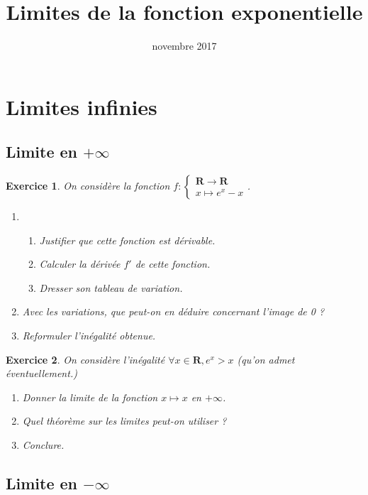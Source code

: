 \documentclass[12pt,a4paper,french]{article}
\title{Limites de la fonction exponentielle}
\author{\bsc{Jumel}}
\date{novembre 2017}
\makeatletter
\renewcommand{\maketitle}%
{\framebox{%
    \begin{minipage}{1.0\linewidth}%
      \begin{center}%
        \Large \@title ~-- \@author \\%
        \@date%
      \end{center}%
    \end{minipage}}%
  \normalsize%
}
\newcommand{\R}{\mathbf{R}}
\theoremstyle{break}
\theoremstyle{plain}
\newtheorem{exerciceT}{Exercice}
\theoremstyle{nonumberplain}
\theoremstyle{nonumberbreak}
\newenvironment{exercice}{\begin{framed}\begin{exerciceT}}{\end{exerciceT}\end{framed}}
\makeatother
\begin{document}
\maketitle

\section{Limites infinies}

\subsection{Limite en $+\infty$}

\begin{exercice}
  On considère la fonction
  $f:\left\lbrace\begin{matrix}\R\to\R\\x\mapsto e^x -
  x\end{matrix}\right.$.
  \begin{enumerate}
    \item
      \begin{enumerate}
        \item Justifier que cette fonction est dérivable.
        \item Calculer la dérivée $f'$ de cette fonction.
        \item Dresser son tableau de variation.
      \end{enumerate}
    \item Avec les variations, que peut-on en déduire concernant l'image
      de 0 ?
    \item Reformuler l'inégalité obtenue.
  \end{enumerate}
\end{exercice}

\begin{exercice}
  On considère l'inégalité $\forall x\in \R, e^x > x$ (qu'on admet
  éventuellement.)

  \begin{enumerate}
    \item Donner la limite de la fonction $x\mapsto x$ en $+\infty$.
    \item Quel théorème sur les limites peut-on utiliser ?
    \item Conclure.
  \end{enumerate}
\end{exercice}

\subsection{Limite en $-\infty$}
\end{document}
